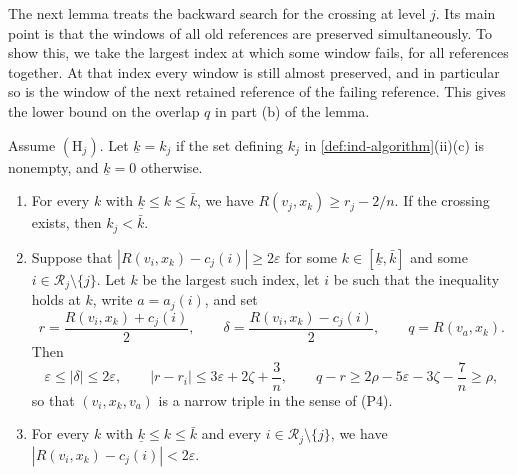 The next lemma treats the backward search for the crossing at level $j$. Its main point is that the windows of all old references are preserved simultaneously. To show this, we take the largest index at which some window fails, for all references together. At that index every window is still almost preserved, and in particular so is the window of the next retained reference of the failing reference. This gives the lower bound on the overlap $q$ in part (b) of the lemma.

\begin{lemma}\label{lem:ind-search}
Assume $(\mathrm H_j)$. Let $\underline k=k_j$ if the set defining $k_j$ in \cref{def:ind-algorithm}(ii)(c) is nonempty, and $\underline k=0$ otherwise.
\begin{enumerate}[label=(\alph*)]
\item For every $k$ with $\underline k\le k\le {\bar k}$, we have $R(v_j,x_k)\ge r_j-2/n$. If the crossing exists, then $k_j<{\bar k}$.
\item Suppose that $|R(v_i,x_k)-c_j(i)|\ge2\varepsilon$ for some $k\in[\underline k,{\bar k}]$ and some $i\in\mathcal R_j\setminus\{j\}$. Let $k$ be the largest such index, let $i$ be such that the inequality holds at $k$, write $a=a_j(i)$, and set
\[
 r=\frac{R(v_i,x_k)+c_j(i)}2,\qquad \delta=\frac{R(v_i,x_k)-c_j(i)}2,\qquad q=R(v_a,x_k).
\]
Then
\begin{equation}\label{b:dyn:first-exit-gap}
 \varepsilon\le|\delta|\le2\varepsilon,\qquad
 |r-r_i|\le3\varepsilon+2\zeta+\frac3n,\qquad
 q-r\ge2\rho-5\varepsilon-3\zeta-\frac7n\ge\rho,
\end{equation}
so that $(v_i,x_k,v_a)$ is a narrow triple in the sense of (P4).
\item For every $k$ with $\underline k\le k\le {\bar k}$ and every $i\in\mathcal R_j\setminus\{j\}$, we have $|R(v_i,x_k)-c_j(i)|<2\varepsilon$.
\end{enumerate}
\end{lemma}

